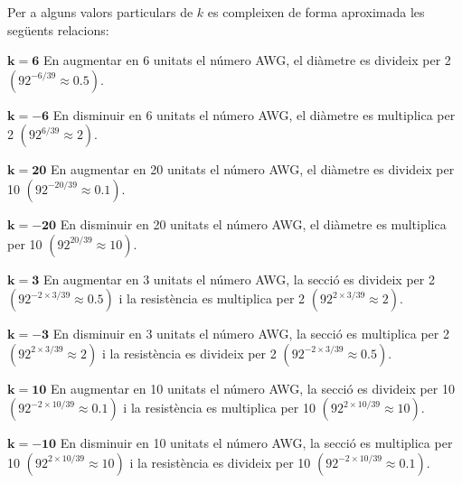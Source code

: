 Per a alguns valors particulars de $k$ es compleixen de forma aproximada les seg\"{u}ents relacions:

\begin{list}{}
   {\setlength{\labelwidth}{15mm} \setlength{\leftmargin}{17mm} \setlength{\labelsep}{2mm}}

   \item[$\boldsymbol{k=6}$\hfill] En augmentar en 6  unitats el n\'{u}mero AWG, el di\`{a}metre es divideix per 2
                 $(92^{-6/39}\approx \num{0,5})$.

   \item[$\boldsymbol{k=-6}$\hfill] En disminuir en 6 unitats el n\'{u}mero AWG, el di\`{a}metre es multiplica per 2
                 $(92^{6/39}\approx 2)$.

   \item[$\boldsymbol{k=20}$\hfill] En augmentar en 20  unitats el n\'{u}mero AWG, el di\`{a}metre es divideix per 10
                 $(92^{-20/39}\approx \num{0,1})$.

   \item[$\boldsymbol{k=-20}$\hfill] En disminuir en 20 unitats el n\'{u}mero AWG, el di\`{a}metre es multiplica per 10
                 $(92^{20/39}\approx 10)$.

   \item[$\boldsymbol{k=3}$\hfill] En augmentar en 3 unitats el n\'{u}mero AWG, la secci\'{o} es divideix per 2
                 $(92^{-2\times 3/39}\approx \num{0,5})$ i la resist\`{e}ncia es multiplica per 2
                 $(92^{2\times 3/39}\approx 2)$.

   \item[$\boldsymbol{k=-3}$\hfill] En disminuir en 3 unitats el n\'{u}mero AWG, la secci\'{o} es multiplica per 2
                  $(92^{2\times 3/39}\approx 2)$ i la resist\`{e}ncia es divideix per 2
                  $(92^{-2\times 3/39}\approx \num{0,5})$.

   \item[$\boldsymbol{k=10}$\hfill] En augmentar en 10 unitats el n\'{u}mero AWG, la secci\'{o} es divideix per 10
                 $(92^{-2\times 10/39}\approx \num{0,1})$ i la resist\`{e}ncia es multiplica per 10
                 $(92^{2\times 10/39}\approx 10)$.

   \item[$\boldsymbol{k=-10}$\hfill] En disminuir en 10 unitats el n\'{u}mero AWG, la secci\'{o} es multiplica per 10
                  $(92^{2\times 10/39}\approx 10)$ i la resist\`{e}ncia es divideix per 10
                  $(92^{-2\times 10/39}\approx \num{0,1})$.
\end{list}


